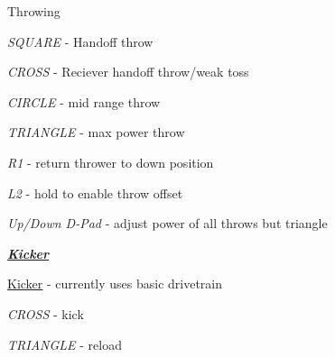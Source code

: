 \begin{DoxyItemize}
{\begin{DoxyItemize}
\item Throwing
\begin{DoxyItemize}
\item {\itshape S\+Q\+U\+A\+RE} -\/ Handoff throw
\item {\itshape C\+R\+O\+SS} -\/ Reciever handoff throw/weak toss
\item {\itshape C\+I\+R\+C\+LE} -\/ mid range throw
\item {\itshape T\+R\+I\+A\+N\+G\+LE} -\/ max power throw
\item {\itshape R1} -\/ return thrower to down position
\item {\itshape L2} -\/ hold to enable throw offset
\begin{DoxyItemize}
\item {\itshape Up/\+Down D-\/\+Pad} -\/ adjust power of all throws but triangle
\end{DoxyItemize}
\end{DoxyItemize}
\end{DoxyItemize}}
\item {\itshape {\bfseries \mbox{\hyperlink{class_kicker}{Kicker}}}
\begin{DoxyItemize}
\item \mbox{\hyperlink{class_kicker}{Kicker}} -\/ currently uses basic drivetrain
\item {\itshape C\+R\+O\+SS} -\/ kick
\item {\itshape T\+R\+I\+A\+N\+G\+LE} -\/ reload 
\end{DoxyItemize}}
\end{DoxyItemize}